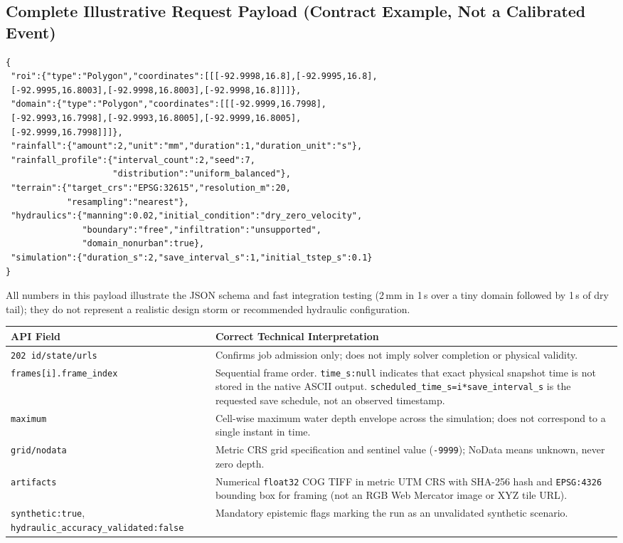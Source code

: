 \documentclass[11pt,a4paper]{article}
\newcommand{\src}[1]{\nolinkurl{#1}}
\begin{document}
\subsection{Complete Illustrative Request Payload (Contract Example, Not a Calibrated Event)}
\begingroup\small
\begin{verbatim}
{
 "roi":{"type":"Polygon","coordinates":[[[-92.9998,16.8],[-92.9995,16.8],
 [-92.9995,16.8003],[-92.9998,16.8003],[-92.9998,16.8]]]},
 "domain":{"type":"Polygon","coordinates":[[[-92.9999,16.7998],
 [-92.9993,16.7998],[-92.9993,16.8005],[-92.9999,16.8005],
 [-92.9999,16.7998]]]},
 "rainfall":{"amount":2,"unit":"mm","duration":1,"duration_unit":"s"},
 "rainfall_profile":{"interval_count":2,"seed":7,
                     "distribution":"uniform_balanced"},
 "terrain":{"target_crs":"EPSG:32615","resolution_m":20,
            "resampling":"nearest"},
 "hydraulics":{"manning":0.02,"initial_condition":"dry_zero_velocity",
               "boundary":"free","infiltration":"unsupported",
               "domain_nonurban":true},
 "simulation":{"duration_s":2,"save_interval_s":1,"initial_tstep_s":0.1}
}
\end{verbatim}
\endgroup
All numbers in this payload illustrate the JSON schema and fast integration testing (2\,mm in 1\,s over a tiny domain followed by 1\,s of dry tail); they do not represent a realistic design storm or recommended hydraulic configuration.

\noindent\begin{tabularx}{\linewidth}{p{.23\linewidth}X}
\toprule API Field & Correct Technical Interpretation\\\midrule
\texttt{202 id/state/urls} & Confirms job admission only; does not imply solver completion or physical validity.\\
\src{frames[i].frame_index} & Sequential frame order. \texttt{time\_s:null} indicates that exact physical snapshot time is not stored in the native ASCII output. \texttt{scheduled\_time\_s=i*save\_interval\_s} is the requested save schedule, not an observed timestamp.\\
\texttt{maximum} & Cell-wise maximum water depth envelope across the simulation; does not correspond to a single instant in time.\\
\texttt{grid/nodata} & Metric CRS grid specification and sentinel value (\texttt{-9999}); NoData means unknown, never zero depth.\\
\texttt{artifacts} & Numerical \texttt{float32} COG TIFF in metric UTM CRS with SHA-256 hash and \texttt{EPSG:4326} bounding box for framing (not an RGB Web Mercator image or XYZ tile URL).\\
\src{synthetic:true}, \src{hydraulic_accuracy_validated:false} & Mandatory epistemic flags marking the run as an unvalidated synthetic scenario.\\\bottomrule
\end{tabularx}
\end{document}
